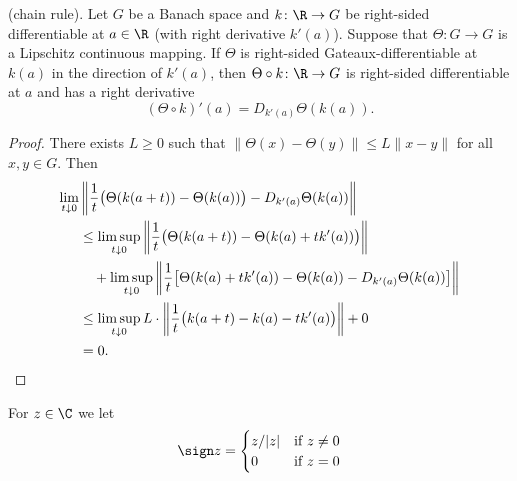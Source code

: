 \begin{proposition} \label{prop:b2-2.3}
(chain rule). Let $G$ be a Banach space and $k \colon \R \to G$ be right-sided differentiable at $a \in \R$ (with right derivative $k'(a)$).
Suppose that $\Theta \colon G \to G$ is a Lipschitz continuous mapping.
If\/ $\Theta$ is right-sided Gateaux-differentiable at $k(a)$ in the direction of\/ $k'(a)$, then $\Theta \circ k \colon \R \to G$ is right-sided differentiable at $a$ and has a right derivative
\begin{equation}\label{eq:b2-2.4}
(\Theta \circ k)'(a) = D_{k'(a)}\Theta(k(a)).
\end{equation}
\end{proposition}
\begin{proof}
There exists $L \geq 0$ such that $\|\Theta(x) - \Theta(y)\| \leq L\|x - y\|$ for all $x,y \in G$.
Then
\[
\begin{aligned}
\lim_{t \downarrow 0} &\left\|\frac{1}{t} \bigl(\Theta(k(a+t)) - \Theta(k(a))\bigr) - D_{k'(a)}\Theta(k(a))\right\| \\
&\leq \limsup_{t \downarrow 0} \left\|\frac{1}{t} \bigl(\Theta(k(a+t)) - \Theta(k(a)+tk'(a))\bigr)\right\| \\
&\quad + \limsup_{t \downarrow 0} \left\|\frac{1}{t} \bigl[\Theta(k(a)+tk'(a)) - \Theta(k(a)) - D_{k'(a)}\Theta(k(a))\bigr]\right\| \\
&\leq \limsup_{t \downarrow 0} L \cdot \left\|\frac{1}{t} \bigl(k(a+t) - k(a)-tk'(a)\bigr)\right\| + 0 \\
&= 0.
\qedhere
\end{aligned}
\]
\end{proof}
For $z \in \C$ we let
\begin{equation}\label{eq:b2-2.5}
\sign z = \begin{cases}
    z/|z| & \text{if } z \neq 0 \\
    0 & \text{if } z = 0
\end{cases}
\end{equation}
